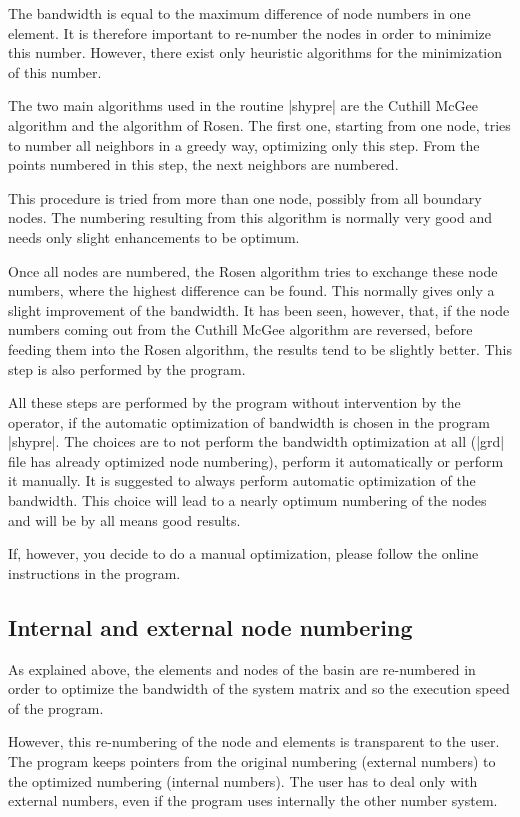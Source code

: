 The bandwidth is equal to the maximum difference of node numbers
in one element. It is therefore important to re-number the
nodes in order to minimize this number. However, there exist
only heuristic algorithms for the minimization of this number.

The two main algorithms used in the routine |shypre| are
the Cuthill McGee algorithm and the algorithm of Rosen. The first
one, starting from one node, tries to number all neighbors in
a greedy way, optimizing only this step. From the points
numbered in this step, the next neighbors are numbered.

This procedure is tried from more than one node, possibly
from all boundary nodes. The numbering resulting from this
algorithm is normally very good and needs only slight
enhancements to be optimum.

Once all nodes are numbered, the Rosen algorithm tries to
exchange these node numbers, where the highest difference
can be found. This normally gives only a slight improvement
of the bandwidth. It has been seen, however, that, if the
node numbers coming out from the Cuthill McGee algorithm
are reversed, before feeding them into the Rosen algorithm, 
the results tend to be slightly better. This step is also
performed by the program.

All these steps are performed by the program without
intervention by the operator, if the automatic optimization
of bandwidth is chosen in the program |shypre|. The choices
are to not perform the bandwidth optimization at all
(|grd| file has already optimized node numbering), perform
it automatically or perform it manually. It is suggested
to always perform automatic optimization of the bandwidth.
This choice will lead to a nearly optimum numbering of the
nodes and will be by all means good results.

If, however, you decide to do a manual optimization, please
follow the online instructions in the program.

\subsection{Internal and external node numbering}

As explained above, the elements and nodes of the basin are re-numbered 
in order to optimize the bandwidth of the system matrix and so
the execution speed of the program. 

However, this re-numbering of the node and elements is transparent
to the user. The program keeps pointers from the original numbering
(external numbers) to the optimized numbering (internal numbers).
The user has to deal only with external numbers, even if the 
program uses internally the other number system.

